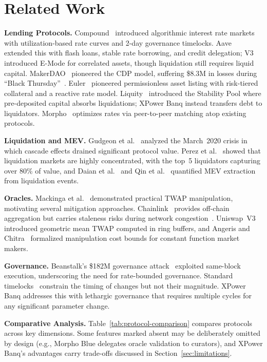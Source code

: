 \documentclass[10pt,a4paper,twocolumn]{article}
\begin{document}
\section{Related Work}
\label{sec:related}

\textbf{Lending Protocols.} Compound~\cite{compound2019} introduced algorithmic interest rate markets with utilization-based rate curves and 2-day governance timelocks. Aave~\cite{aave2020} extended this with flash loans, stable rate borrowing, and credit delegation; V3 introduced E-Mode for correlated assets, though liquidation still requires liquid capital. MakerDAO~\cite{makerdao2017} pioneered the CDP model, suffering \$8.3M in losses during ``Black Thursday''~\cite{gudgeon2020}. Euler~\cite{euler2022} pioneered permissionless asset listing with risk-tiered collateral and a reactive rate model. Liquity~\cite{liquity2021} introduced the Stability Pool where pre-deposited capital absorbs liquidations; XPower Banq instead transfers debt to liquidators. Morpho~\cite{morpho2022} optimizes rates via peer-to-peer matching atop existing protocols.

\textbf{Liquidation and MEV.} Gudgeon et al.~\cite{gudgeon2020} analyzed the March~2020 crisis in which cascade effects drained significant protocol value. Perez et al.~\cite{perez2021} showed that liquidation markets are highly concentrated, with the top~5 liquidators capturing over 80\% of value, and Daian et al.~\cite{daian2020} and Qin et al.~\cite{qin2022} quantified MEV extraction from liquidation events.

\textbf{Oracles.} Mackinga et al.~\cite{mackinga2022} demonstrated practical TWAP manipulation, motivating several mitigation approaches. Chainlink~\cite{chainlink2017} provides off-chain aggregation but carries staleness risks during network congestion~\cite{werner2022}. Uniswap~V3~\cite{uniswap2021} introduced geometric mean TWAP computed in ring buffers, and Angeris and Chitra~\cite{angeris2020} formalized manipulation cost bounds for constant function market makers.

\textbf{Governance.} Beanstalk's \$182M governance attack~\cite{beanstalk2022} exploited same-block execution, underscoring the need for rate-bounded governance. Standard timelocks~\cite{openzeppelin2020} constrain the timing of changes but not their magnitude. XPower Banq addresses this with lethargic governance that requires multiple cycles for any significant parameter change.

\textbf{Comparative Analysis.} Table~\ref{tab:protocol-comparison} compares protocols across key dimensions. Some features marked absent may be deliberately omitted by design (e.g., Morpho Blue delegates oracle validation to curators), and XPower Banq's advantages carry trade-offs discussed in Section~\ref{sec:limitations}.
\end{document}
